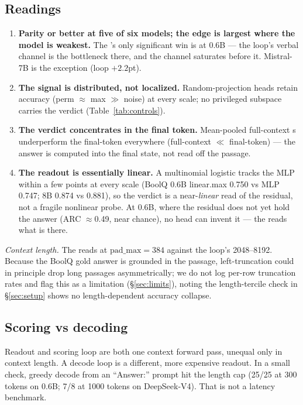 \subsection{Readings}

\begin{enumerate}
\item \textbf{Parity or better at five of six models; the edge is largest
  where the model is weakest.} The \head{}'s only significant win is at 0.6B
  --- the loop's verbal channel is the bottleneck there, and the \head{}
  channel saturates before it. Mistral-7B is the exception (loop $+2.2$pt).
\item \textbf{The signal is distributed, not localized.} Random-projection
  heads retain accuracy (perm $\approx$ max $\gg$ noise) at every scale; no
  privileged subspace carries the verdict (Table~\ref{tab:controls}).
\item \textbf{The verdict concentrates in the final token.} Mean-pooled
  full-context \head{}s underperform the final-token \head{} everywhere
  (full-context $\ll$ final-token) --- the answer is computed into the final
  state, not read off the passage.
\item \textbf{The readout is essentially linear.} A multinomial logistic
  \head{} tracks the MLP within a few points at every scale (BoolQ 0.6B
  linear.max 0.750 vs MLP 0.747; 8B 0.874 vs 0.881), so the verdict is a
  near-\emph{linear} read of the residual, not a fragile nonlinear probe. At
  0.6B, where the residual does not yet hold the answer (ARC $\approx$0.49,
  near chance), no head can invent it --- the \head{} reads what is there.
\end{enumerate}

\emph{Context length.} The \head{} reads at $\mathrm{pad\_max}=384$ against
the loop's 2048--8192. Because the BoolQ gold answer is grounded in the
passage, left-truncation could in principle drop long passages
asymmetrically; we do not log per-row truncation rates and flag this as a
limitation (\S\ref{sec:limits}), noting the length-tercile check in
\S\ref{sec:setup} shows no length-dependent accuracy collapse.

\subsection{Scoring vs decoding}

Readout and scoring loop are both one context forward pass, unequal only in
context length. A decode loop is a different, more expensive readout. In a
small check, greedy decode from an ``Answer:'' prompt hit the length cap
(25/25 at 300 tokens on 0.6B; 7/8 at 1000 tokens on DeepSeek-V4). That is
not a latency benchmark.

